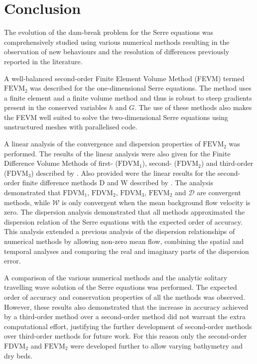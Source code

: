 
\chapter{Conclusion}
\label{chp:Conclusion}



The evolution of the dam-break problem for the Serre equations was comprehensively studied using various numerical methods resulting in the observation of new behaviours and the resolution of differences previously reported in the literature. 

A well-balanced second-order Finite Element Volume Method (FEVM) termed $\text{FEVM}_2$ was described for the one-dimensional Serre equations. The method uses a finite element and a finite volume method and thus is robust to steep gradients present in the conserved variables $h$ and $G$. The use of these methods also makes the FEVM well suited to solve the two-dimensional Serre equations using unstructured meshes with parallelised code. 

A linear analysis of the convergence and dispersion properties of $\text{FEVM}_2$ was performed. The results of the linear analysis were also given for the Finite Difference Volume Methods of first- ($\text{FDVM}_1$), second- ($\text{FDVM}_2$) and third-order ($\text{FDVM}_3$) described by \citet{Zoppou-etal-2017}. Also provided were the linear results for the second-order finite difference methods $\text{D}$ and $\text{W}$ described by \citet{Pitt-2018-61}. The analysis demonstrated that $\text{FDVM}_1$, $\text{FDVM}_2$, $\text{FDVM}_3$, $\text{FEVM}_2$ and $\mathcal{D}$ are convergent methods, while $\mathcal{W}$ is only convergent when the mean background flow velocity is zero. The dispersion analysis demonstrated that all methods approximated the dispersion relation of the Serre equations with the expected order of accuracy. This analysis extended a previous analysis of the dispersion relationships of numerical methods \cite{Filippini-etal-2016-381} by allowing non-zero mean flow, combining the spatial and temporal analyses and comparing the real and imaginary parts of the dispersion error. 

A comparison of the various numerical methods and the analytic solitary travelling wave solution of the Serre equations was performed. The expected order of accuracy and conservation properties of all the methods was observed. However, these results also demonstrated that the increase in accuracy achieved by a third-order method over a second-order method did not warrant the extra computational effort, justifying the further development of second-order methods over third-order methods for future work. For this reason only the second-order $\text{FDVM}_2$ and $\text{FEVM}_2$ were developed further to allow varying bathymetry and dry beds.

